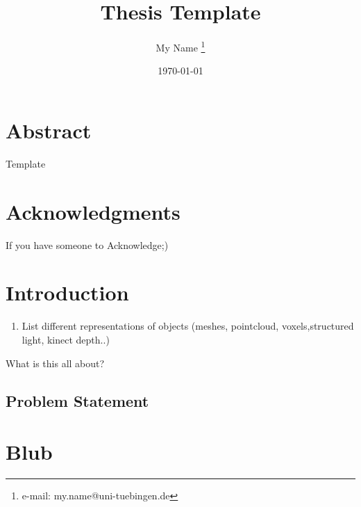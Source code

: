 \documentclass[a4paper,cleardoubleempty,BCOR1cm]{scrbook}
\title{Thesis Template}
\author{My Name \thanks{e-mail: my.name@uni-tuebingen.de}}
\date{\today}
\begin{document}


\chapter*{Abstract}
Template

\chapter*{Acknowledgments}
If you have someone to Acknowledge;)


\tableofcontents


\chapter{Introduction}
\begin{enumerate}
    \item List different representations of objects (meshes, pointcloud, voxels,structured light, kinect depth..)
  \end{enumerate}
What is this all about?

\section{Problem Statement}













\appendix
\chapter{Blub}

%

\end{document}
